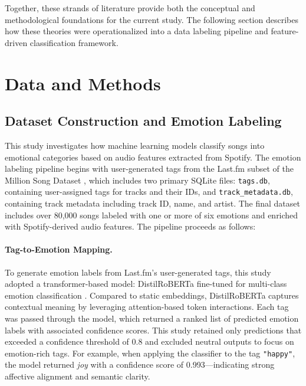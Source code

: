 \documentclass{article}
\begin{document}
Together, these strands of literature provide both the conceptual and methodological foundations for the current study. The following section describes how these theories were operationalized into a data labeling pipeline and feature-driven classification framework.

\section{Data and Methods}

\subsection{Dataset Construction and Emotion Labeling}

This study investigates how machine learning models classify songs into emotional categories based on audio features extracted from Spotify. The emotion labeling pipeline begins with user-generated tags from the Last.fm subset of the Million Song Dataset \parencite{MillionSongDataset}, which includes two primary SQLite files: \texttt{tags.db}, containing user-assigned tags for tracks and their IDs, and \texttt{track\_metadata.db}, containing track metadata including track ID, name, and artist. The final dataset includes over 80,000 songs labeled with one or more of six emotions and enriched with Spotify-derived audio features. The pipeline proceeds as follows:

\paragraph{Tag-to-Emotion Mapping.}

To generate emotion labels from Last.fm’s user-generated tags, this study adopted a transformer-based model: DistilRoBERTa fine-tuned for multi-class emotion classification \parencite{Hartman2022}. Compared to static embeddings, DistilRoBERTa captures contextual meaning by leveraging attention-based token interactions. Each tag was passed through the model, which returned a ranked list of predicted emotion labels with associated confidence scores. This study retained only predictions that exceeded a confidence threshold of 0.8 and excluded neutral outputs to focus on emotion-rich tags. For example, when applying the classifier to the tag \texttt{"happy"}, the model returned \textit{joy} with a confidence score of 0.993—indicating strong affective alignment and semantic clarity.

\end{document}

